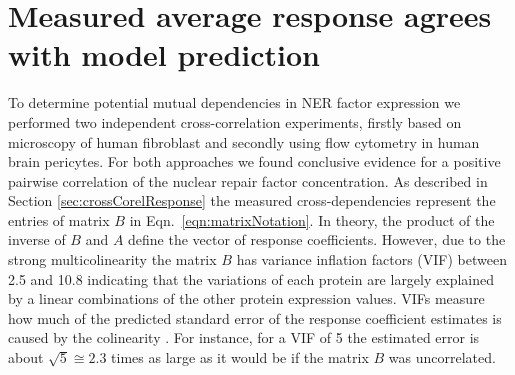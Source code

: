 \section{Measured average response agrees with model prediction}
To determine potential mutual dependencies in NER factor expression we performed two independent cross-correlation experiments, firstly based on microscopy of human fibroblast and secondly using flow cytometry in human brain pericytes. For both approaches we found conclusive evidence for a positive pairwise correlation of the nuclear repair factor concentration. As described in Section \ref{sec:crossCorelResponse} the measured cross-dependencies represent the entries of matrix $B$ in Eqn.\ \ref{eqn:matrixNotation}. In theory, the product of the inverse of $B$ and $A$ define the vector of response coefficients. However, due to the strong multicolinearity the matrix $B$ has variance inflation factors (VIF) between 2.5 and 10.8 indicating that the variations of each protein are largely explained by a linear combinations of the other protein expression values. VIFs measure how much of the predicted standard error of the response coefficient estimates is caused by the colinearity \cite{allison1999multiple}. For instance, for a VIF of 5 the estimated error is  about $\sqrt{5} \cong 2.3$ times as large as it would be if the matrix $B$ was uncorrelated.\\ 
